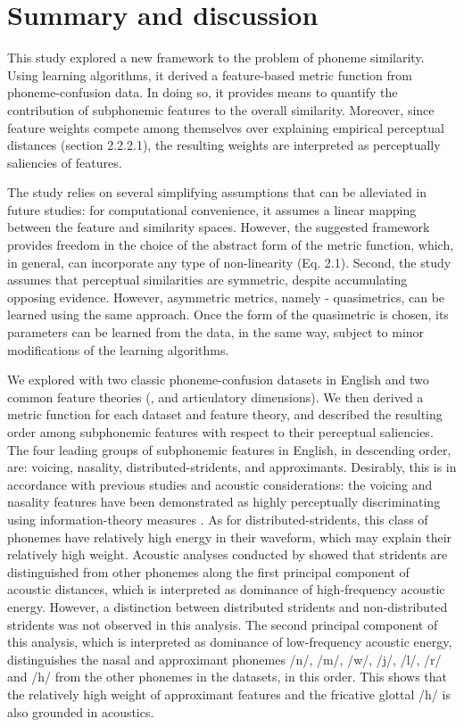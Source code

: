 \section{Summary and discussion}
This study explored a new framework to the problem of phoneme similarity. Using learning algorithms, it derived a feature-based metric function from phoneme-confusion data. In doing so, it provides means to quantify the contribution of subphonemic features to the overall similarity. Moreover, since feature weights compete among themselves over explaining empirical perceptual distances (section 2.2.2.1), the resulting weights are interpreted as perceptually saliencies of features.

The study relies on several simplifying assumptions that can be alleviated in future studies: for computational convenience, it assumes a linear mapping between the feature and similarity spaces. However, the suggested framework provides freedom in the choice of the abstract form of the metric function, which, in general, can incorporate any type of non-linearity (Eq. 2.1). Second, the study assumes that perceptual similarities are symmetric, despite accumulating opposing evidence. However, asymmetric metrics, namely - quasimetrics, can be learned using the same approach. Once the form of the quasimetric is chosen, its parameters can be learned from the data, in the same way, subject to minor modifications of the learning algorithms. 

We explored with two classic phoneme-confusion datasets in English \citep{NicelyMiller1955, Luce1987} and two common feature theories (\citealp{ChomskyHalle1968}, and articulatory dimensions). We then derived a metric function for each dataset and feature theory, and described the resulting order among subphonemic features with respect to their perceptual saliencies. The four leading groups of subphonemic features in English, in descending order, are: voicing, nasality, distributed-stridents, and approximants. Desirably, this is in accordance with previous studies and acoustic considerations: the voicing and nasality features have been demonstrated as highly perceptually discriminating using information-theory measures \citep{NicelyMiller1955}. As for distributed-stridents, this class of phonemes have relatively high energy in their waveform, which may explain their relatively high weight. Acoustic analyses conducted by \citep[see][Figure 15]{Mielke2012} showed that stridents are distinguished from other phonemes along the first principal component of acoustic distances, which is interpreted as dominance of high-frequency acoustic energy. However, a distinction between distributed stridents and non-distributed stridents was not observed in this analysis. The second principal component of this analysis, which is interpreted as dominance of low-frequency acoustic energy, distinguishes the nasal and approximant phonemes /n/, /m/, /w/, /j/, /l/, /r/ and /h/ from the other phonemes in the datasets, in this order. This shows that the relatively high weight of approximant features and the fricative glottal /h/ is also grounded in acoustics.

